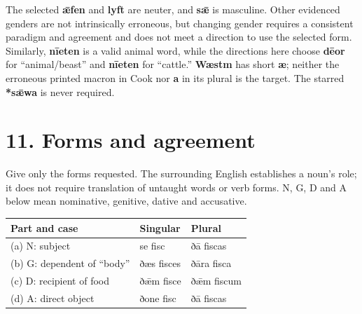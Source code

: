 The selected \textbf{ǣfen} and \textbf{lyft} are neuter, and \textbf{sǣ} is masculine. Other evidenced genders are not intrinsically erroneous, but changing gender requires a consistent paradigm and agreement and does not meet a direction to use the selected form. Similarly, \textbf{nīeten} is a valid animal word, while the directions here choose \textbf{dēor} for “animal/\allowbreak{}beast” and \textbf{nīeten} for “cattle.” \textbf{Wæstm} has short \textbf{æ}; neither the erroneous printed macron in Cook nor \textbf{a} in its plural is the target. The starred \textbf{*sǣwa} is never required.

\section*{11. Forms and agreement}

Give only the forms requested. The surrounding English establishes a noun's role; it does not require translation of untaught words or verb forms. N, G, D and A below mean nominative, genitive, dative and accusative.


\par\begingroup
\fontsize{10.5}{13.2}\selectfont
\setlength{\LTleft}{0pt}\setlength{\LTright}{\fill}
\noindent
\begin{tabular}{@{}>{\raggedright\arraybackslash}p{53.778mm}>{\raggedright\arraybackslash}p{32.299mm}>{\raggedright\arraybackslash}p{32.299mm}@{}}
\toprule
\textbf{Part and case} & \textbf{Singular} & \textbf{Plural} \\
\midrule
(a) N: subject & se fisc & ðā fiscas \\
(b) G: dependent of “body” & ðæs fisces & ðāra fisca \\
(c) D: recipient of food & ðǣm fisce & ðǣm fiscum \\
(d) A: direct object & ðone fisc & ðā fiscas \\
\bottomrule
\end{tabular}
\par\endgroup

